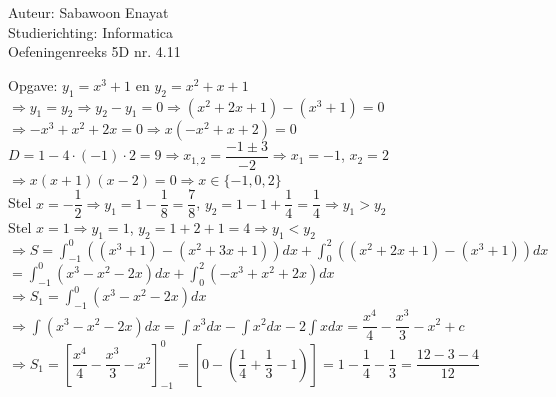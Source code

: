\documentclass[a4paper]{article}
\begin{document}
  
\noindent \large Auteur: Sabawoon Enayat \\
\noindent \large Studierichting: Informatica\\
\noindent \large Oefeningenreeks 5D nr. 4.11 \\

\newcommand{\dint}{\displaystyle\int}

\medskip

\normalsize

Opgave: $y_1 = x^3 + 1$ en $y_2 = x^2 + x + 1$\\

$\Rightarrow y_1 = y_2 \Rightarrow y_2 - y_1 = 0 \Rightarrow \left(x^2 + 2x + 1\right) - \left(x^3 + 1\right) = 0$\\

$\Rightarrow -x^3 + x^2 + 2x = 0 \Rightarrow x\left(-x^2 + x + 2\right) = 0$\\

$D = 1 - 4 \cdot (-1) \cdot 2 = 9 \Rightarrow x_{1,2} = \dfrac{-1 \pm 3}{-2} \Rightarrow x_1 = -1$, $x_2 = 2$\\

$\Rightarrow x(x+1)(x-2) = 0 \Rightarrow x \in \{-1, 0, 2\}$\\

Stel $x = -\dfrac{1}{2} \Rightarrow y_1 = 1 - \dfrac{1}{8} = \dfrac{7}{8}$, $y_2 = 1 - 1 + \dfrac{1}{4} = \dfrac{1}{4} \Rightarrow y_1 > y_2$\\

Stel $x = 1 \Rightarrow y_1 = 1$, $y_2 = 1 + 2 + 1 = 4 \Rightarrow y_1 < y_2$\\

$\Rightarrow S = \dint_{-1}^{0} \left(\left(x^3 + 1\right) - \left(x^2 + 3x + 1\right)\right)dx + \dint_{0}^{2} \left(\left(x^2 +2x + 1\right) - \left(x^3 + 1\right)\right)dx$\\

$= \dint_{-1}^{0} \left(x^3 - x^2 - 2x\right)dx + \dint_{0}^{2} \left(-x^3 + x^2 + 2x\right)dx$\\

$\Rightarrow S_1 = \dint_{-1}^{0} \left(x^3 - x^2 - 2x\right)dx$\\

$\Rightarrow \dint \left(x^3 - x^2 - 2x\right)dx = \dint x^3 dx - \dint x^2 dx - 2 \dint xdx = \dfrac{x^4}{4} - \dfrac{x^3}{3} - x^2 + c$\\

$\Rightarrow S_1 = \left[\dfrac{x^4}{4} - \dfrac{x^3}{3} - x^2\right]_{-1}^{0} = \left[0 - \left(\dfrac{1}{4} + \dfrac{1}{3} - 1\right)\right] = 1 - \dfrac{1}{4} - \dfrac{1}{3} = \dfrac{12 - 3 - 4}{12}$\\
\end{document}
